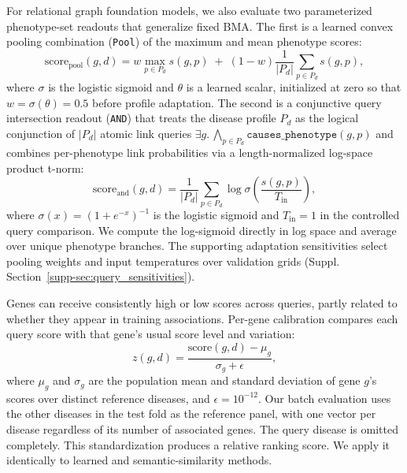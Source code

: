\documentclass[webpdf,contemporary,large]{oup-authoring-template}%
\theoremstyle{thmstyleone}%
\theoremstyle{thmstyletwo}%
\theoremstyle{thmstylethree}%
\begin{document}
For relational graph foundation models, we also evaluate two parameterized
phenotype-set readouts that generalize fixed BMA. The first is a learned convex
pooling combination (\texttt{Pool}) of the maximum and mean phenotype scores:
\begin{equation}
  \label{eq:pool}
  \text{score}_{\mathrm{pool}}(g, d) = w \max_{p \in P_d} s(g, p)
    \;+\; (1 - w)\frac{1}{|P_d|}\sum_{p \in P_d} s(g, p),
\end{equation}
where $\sigma$ is the logistic sigmoid and $\theta$ is a learned scalar,
initialized at zero so that $w=\sigma(\theta)=0.5$ before profile adaptation. The
second is a conjunctive query intersection readout (\texttt{AND}) that treats
the disease profile $P_d$ as the logical conjunction of $|P_d|$ atomic link
queries $\exists g.\,\bigwedge_{p \in P_d}\texttt{causes\_phenotype}(g, p)$ and
combines per-phenotype link probabilities via a length-normalized log-space
product t-norm:
\begin{equation}
  \label{eq:and}
  \text{score}_{\mathrm{and}}(g, d) = \frac{1}{|P_d|}\sum_{p \in P_d}
    \log \sigma\!\left(\frac{s(g, p)}{T_{\mathrm{in}}}\right),
\end{equation}
where $\sigma(x) = (1 + e^{-x})^{-1}$ is the logistic sigmoid and
$T_{\mathrm{in}}=1$ in the controlled query comparison. We compute the
log-sigmoid directly in log space and average over unique phenotype branches.
The supporting adaptation sensitivities select pooling weights and input
temperatures over validation grids (Suppl.
Section~\ref{supp-sec:query_sensitivities}).

Genes can receive consistently high or low
scores across queries, partly related to whether they appear in training
associations. Per-gene calibration compares each query score with that gene's
usual score level and variation:
\begin{equation}
  \label{eq:calibration}
  z(g, d) = \frac{\text{score}(g, d) - \mu_g}{\sigma_g + \epsilon},
\end{equation}
where $\mu_g$ and $\sigma_g$ are the population mean and standard
deviation of gene $g$'s scores over distinct reference diseases, and
$\epsilon=10^{-12}$. Our batch evaluation uses the other diseases in the test
fold as the reference panel, with one vector per disease regardless of its
number of associated genes. The query disease is omitted completely. This
standardization produces a relative ranking score. We apply it identically to
learned and semantic-similarity methods.
\end{document}
